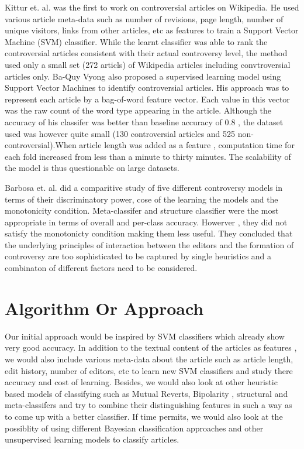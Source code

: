 \documentclass[twocolumn]{article}
\begin{document}
   Kittur et. al. was the first to work on controversial articles on
Wikipedia. He used various article meta-data such as number of
revisions, page length, number of unique visitors, links from other
articles, etc as features to train a Support Vector Machine (SVM)
classifier. While the learnt classifier was able to rank the
controversial articles consistent with their actual controversy level,
the method used only a small set (272 articls) of Wikipedia articles
including convtroversial articles only.  Ba-Quy Vyong also proposed a
supervised learning model using Support Vector Machines to identify
controversial articles. His approach was to represent each article by
a bag-of-word feature vector. Each value in this vector was the raw
count of the word type appearing in the article. Although the accuracy
of his classifer was better than baseline accuracy of 0.8 , the
dataset used was however quite small (130 controversial articles and
525 non-controversial).When article length was added as a feature ,
computation time for each fold increased from less than a minute to
thirty minutes. The scalability of the model is thus questionable on
large datasets.

   Barbosa et. al. did a comparitive study of five different
controversy models in terms of their discriminatory power, cose of the
learning the models and the monotonicity condition.  Meta-classifer
and structure classifier were the most appropriate in terms of overall
and per-class accuracy. Howerver , they did not satisfy the
monotonicty condition making them less useful. They concluded that the
underlying principles of interaction between the editors and the
formation of controversy are too sophisticated to be captured by
single heuristics and a combinaton of different factors need to be
considered.


 \section{Algorithm Or Approach}


   Our initial approach would be inspired by SVM classifiers which
     already show
 very good accuracy. In addition to the textual content of the articles
 as features , we would also include various meta-data about the
 article such as article length, edit history, number of editors, etc
 to learn new SVM classifiers and study there accuracy and cost of
 learning. Besides, we would also look at other heuristic based models
 of classifying such as Mutual Reverts, Bipolarity , structural and
 meta-classifers and try to combine their distinguishing features in
 such a way as to come up with a better classifier. If time permits, we
 would also look at the possiblity of using different Bayesian
 classification approaches and other unsupervised learning models to
 classify articles. 
\end{document}
